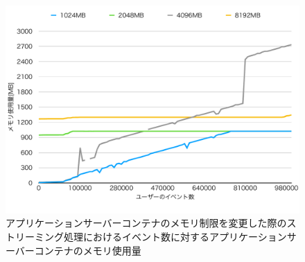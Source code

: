 \documentclass[../../../../../main]{subfiles}
\begin{document}
    \begin{figure}[H]
        \centering
        \includegraphics[width=12cm]{graph}
        \caption{アプリケーションサーバーコンテナのメモリ制限を変更した際のストリーミング処理におけるイベント数に対するアプリケーションサーバーコンテナのメモリ使用量}
        \label{fig:stream-change-app-memory-limit-app-memory-app_4_db_1_1024}
    \end{figure}
\end{document}
